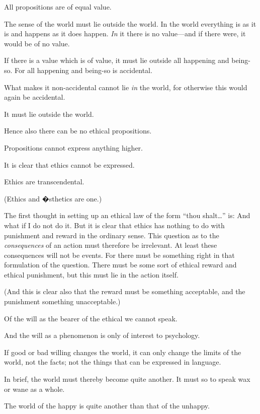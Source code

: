 {All propositions are of equal value.}


{The sense of the world must lie outside the
world. In the world everything is as it is and
happens as it does happen. \emph{In} it there is no value---and
\enlargethispage{11pt} %
if there were, it would be of no value.

If there is a value which is of value, it must
lie outside all happening and being-so. For all
happening and being-so is accidental.

What makes it non-accidental cannot lie \emph{in}
the world, for otherwise this would again be accidental.

It must lie outside the world.}


{Hence also there can be no ethical propositions.

Propositions cannot express anything higher.}


{It is clear that ethics cannot be expressed.

Ethics are transcendental.

(Ethics and �sthetics are one.)}


{The first thought in setting up an ethical law
of the form ``thou shalt\;\ldots'' is: And what
if I do not do it. But it is clear that ethics has
nothing to do with punishment and reward in the
ordinary sense. This question as to the \emph{consequences}
of an action must therefore be irrelevant.
At least these consequences will not be events.
For there must be something right in that formulation
of the question. There must be some sort
of ethical reward and ethical punishment, but this
must lie in the action itself.

(And this is clear also that the reward must be
something acceptable, and the punishment something
unacceptable.)}


{Of the will as the bearer of the ethical we cannot
speak.

And the will as a phenomenon is only of interest
to psychology.}


{If good or bad willing changes the world, it
can only change the limits of the world, not the
facts; not the things that can be expressed in
language.

In brief, the world must thereby become quite
another. It must so to speak wax or wane as a
whole.

The world of the happy is quite another than
that of the unhappy.}


